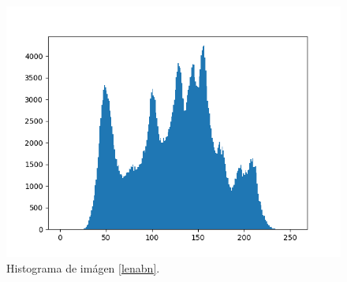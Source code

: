 \documentclass[twoside,spanish,ESP,MSc]{plantillaLabUPV}
\theoremstyle{definition}
\begin{document}
\begin{figure}[h] 
	\centering 
	\includegraphics[scale=.6]{ima/histolena} 
	\caption{Histograma de imágen \ref{lenabn}.} 
	\label{histolena} 
\end{figure}
%
%
%
%
\end{document}
